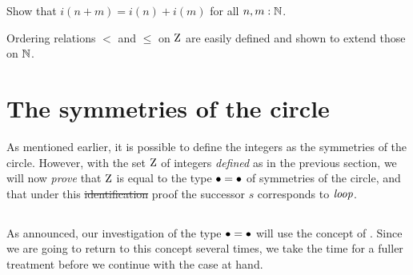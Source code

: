 \begin{xca}\label{xca:addition-on-Z-and-N}
Show that $i(n+m)=i(n)+i(m)$ for all $n,m:\mathbb{N}$.
\end{xca}

Ordering relations $<$ and $\leq$ on $\mathrm{Z}$ are easily defined
and shown to extend those on $\mathbb{N}$.

\section{The symmetries of the circle}
\label{sec:pi1S1isZ}

As mentioned earlier, it is possible to define the integers as the
symmetries of the circle. However, with the set $\mathrm{Z}$ of integers 
\emph{defined} as in the previous section, we will now \emph{prove}
that $\mathrm{Z}$ is equal to the type $\bullet=\bullet$ of symmetries of the circle, 
and that under this \st{identification} proof the successor $s$ corresponds to $\mathit{loop}$.

\subsection{\Coverings}%
\label{sec:covering}


As announced, our investigation of the type $\bullet=\bullet$ will 
use the concept of \coverings.
Since we are going to return to this concept several times, 
we take the time for a fuller treatment before we continue with the case at hand.

